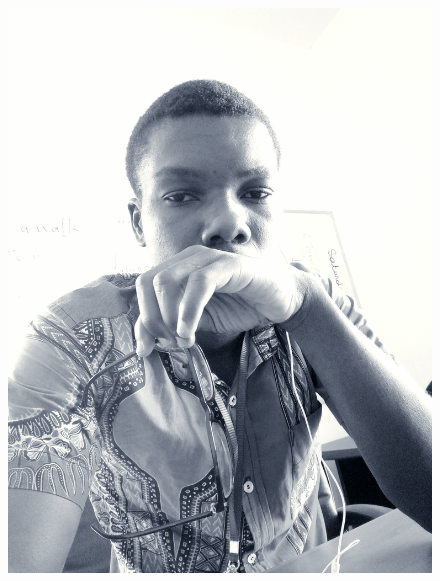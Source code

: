 \documentclass[11pt, a4paper]{awesome-cv} %
\begin{document}

\makecvheader %

\begin{figure}[!h]
\centering
\includegraphics[scale=0.5]{pp}
\end{figure}




\end{document}
